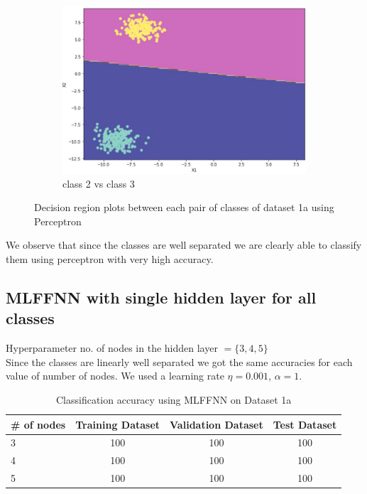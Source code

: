 \documentclass[11pt]{article}
\begin{document}
\begin{figure}[h]
\begin{subfigure}[b]{0.45\textwidth}
	\includegraphics[scale=0.3]{dataset1a_perceptron_23_ds.jpg}
	\caption{class 2 vs class 3}
	\label{fig:fig1.1.7.6}
	\end{subfigure}
\caption{Decision region plots between each pair of classes of dataset 1a using Perceptron}
\label{fig:fig1.1.7}
\end{figure}

We observe that since the classes are well separated we are clearly able to classify them using perceptron with very high accuracy.

\newpage

\subsection{MLFFNN with single hidden layer for all classes}
Hyperparameter no. of nodes in the hidden layer $= \{3,4,5\}$\\

Since the classes are linearly well separated we got the same accuracies for each value of number of nodes. We used a learning rate $\eta = 0.001$, $\alpha = 1$. 
\begin{table}[h!]
\label{tab:tab1.2.1}
\begin{center}
\begin{tabular}{|l|c|c|c|}
\hline
\textbf{\# of nodes} & \textbf{Training Dataset} & \textbf{Validation Dataset} &\textbf{Test Dataset}\\
\hline
3 & 100 & 100 & 100\\
\hline
4 & 100 & 100 & 100\\
\hline
5 & 100 & 100 & 100\\
\hline
\end{tabular}
\caption{Classification accuracy using MLFFNN on Dataset 1a}
\end{center}
\end{table}
\end{document}
